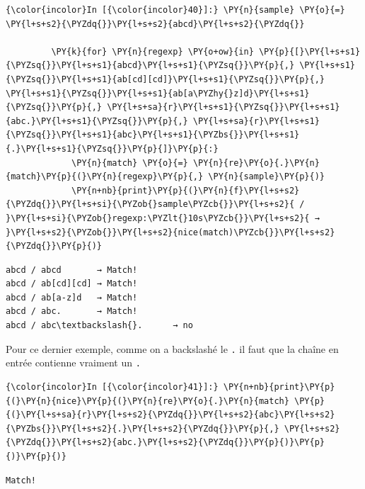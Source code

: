    \begin{Verbatim}[commandchars=\\\{\}]
{\color{incolor}In [{\color{incolor}40}]:} \PY{n}{sample} \PY{o}{=} \PY{l+s+s2}{\PYZdq{}}\PY{l+s+s2}{abcd}\PY{l+s+s2}{\PYZdq{}}
         
         \PY{k}{for} \PY{n}{regexp} \PY{o+ow}{in} \PY{p}{[}\PY{l+s+s1}{\PYZsq{}}\PY{l+s+s1}{abcd}\PY{l+s+s1}{\PYZsq{}}\PY{p}{,} \PY{l+s+s1}{\PYZsq{}}\PY{l+s+s1}{ab[cd][cd]}\PY{l+s+s1}{\PYZsq{}}\PY{p}{,} \PY{l+s+s1}{\PYZsq{}}\PY{l+s+s1}{ab[a\PYZhy{}z]d}\PY{l+s+s1}{\PYZsq{}}\PY{p}{,} \PY{l+s+sa}{r}\PY{l+s+s1}{\PYZsq{}}\PY{l+s+s1}{abc.}\PY{l+s+s1}{\PYZsq{}}\PY{p}{,} \PY{l+s+sa}{r}\PY{l+s+s1}{\PYZsq{}}\PY{l+s+s1}{abc}\PY{l+s+s1}{\PYZbs{}}\PY{l+s+s1}{.}\PY{l+s+s1}{\PYZsq{}}\PY{p}{]}\PY{p}{:}
             \PY{n}{match} \PY{o}{=} \PY{n}{re}\PY{o}{.}\PY{n}{match}\PY{p}{(}\PY{n}{regexp}\PY{p}{,} \PY{n}{sample}\PY{p}{)}
             \PY{n+nb}{print}\PY{p}{(}\PY{n}{f}\PY{l+s+s2}{\PYZdq{}}\PY{l+s+si}{\PYZob{}sample\PYZcb{}}\PY{l+s+s2}{ / }\PY{l+s+si}{\PYZob{}regexp:\PYZlt{}10s\PYZcb{}}\PY{l+s+s2}{ → }\PY{l+s+s2}{\PYZob{}}\PY{l+s+s2}{nice(match)\PYZcb{}}\PY{l+s+s2}{\PYZdq{}}\PY{p}{)}
\end{Verbatim}


    \begin{Verbatim}[commandchars=\\\{\}]
abcd / abcd       → Match!
abcd / ab[cd][cd] → Match!
abcd / ab[a-z]d   → Match!
abcd / abc.       → Match!
abcd / abc\textbackslash{}.      → no

    \end{Verbatim}

    Pour ce dernier exemple, comme on a backslashé le \texttt{.} il faut que
la chaîne en entrée contienne vraiment un \texttt{.}

    \begin{Verbatim}[commandchars=\\\{\}]
{\color{incolor}In [{\color{incolor}41}]:} \PY{n+nb}{print}\PY{p}{(}\PY{n}{nice}\PY{p}{(}\PY{n}{re}\PY{o}{.}\PY{n}{match} \PY{p}{(}\PY{l+s+sa}{r}\PY{l+s+s2}{\PYZdq{}}\PY{l+s+s2}{abc}\PY{l+s+s2}{\PYZbs{}}\PY{l+s+s2}{.}\PY{l+s+s2}{\PYZdq{}}\PY{p}{,} \PY{l+s+s2}{\PYZdq{}}\PY{l+s+s2}{abc.}\PY{l+s+s2}{\PYZdq{}}\PY{p}{)}\PY{p}{)}\PY{p}{)}
\end{Verbatim}


    \begin{Verbatim}[commandchars=\\\{\}]
Match!

    \end{Verbatim}

